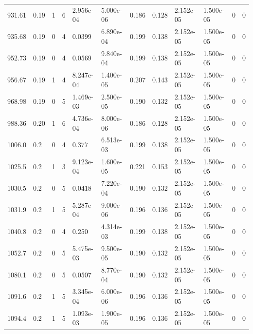 \documentclass[preview]{standalone}
\begin{document}
{{{\begin{tabular}{L{1.2cm}C{1.2cm} C{0.3cm}C{0.5cm} C{1.4cm}C{1.4cm} C{1.4cm}C{1.4cm} C{1.6cm}C{1.6cm} C{1.6cm}C{1.6cm}}
  931.61  &  0.19  & 1     &  6 &  2.956e-04  & 5.000e-06  &  0.186&   0.128& 2.152e-05 & 1.500e-05   &  0 & 0  \\ 
  935.68  &  0.19  & 0     &  4 &  0.0399  & 6.890e-04  &  0.199&   0.138& 2.152e-05 & 1.500e-05   &  0 & 0  \\ 
  952.73  &  0.19  & 0     &  4 &  0.0569  & 9.840e-04  &  0.199&   0.138& 2.152e-05 & 1.500e-05   &  0 & 0  \\ 
  956.67  &  0.19  & 1     &  4 &  8.247e-04  & 1.400e-05  &  0.207&   0.143& 2.152e-05 & 1.500e-05   &  0 & 0  \\ 
  968.98  &  0.19  & 0     &  5 &  1.469e-03  & 2.500e-05  &  0.190&   0.132& 2.152e-05 & 1.500e-05   &  0 & 0  \\ 
  988.36  &  0.20  & 1     &  6 &  4.736e-04  & 8.000e-06  &  0.186&   0.128& 2.152e-05 & 1.500e-05   &  0 & 0  \\ 
  1006.0  &   0.2  & 0     &  4 &  0.377  & 6.513e-03  &  0.199&   0.138& 2.152e-05 & 1.500e-05   &  0 & 0  \\ 
  1025.5  &   0.2  & 1     &  3 &  9.123e-04  & 1.600e-05  &  0.221&   0.153& 2.152e-05 & 1.500e-05   &  0 & 0  \\ 
  1030.5  &   0.2  & 0     &  5 &  0.0418  & 7.220e-04  &  0.190&   0.132& 2.152e-05 & 1.500e-05   &  0 & 0  \\ 
  1031.9  &   0.2  & 1     &  5 &  5.287e-04  & 9.000e-06  &  0.196&   0.136& 2.152e-05 & 1.500e-05   &  0 & 0  \\ 
  1040.8  &   0.2  & 0     &  4 &  0.250  & 4.314e-03  &  0.199&   0.138& 2.152e-05 & 1.500e-05   &  0 & 0  \\ 
  1052.7  &   0.2  & 0     &  5 &  5.475e-03  & 9.500e-05  &  0.190&   0.132& 2.152e-05 & 1.500e-05   &  0 & 0  \\ 
  1080.1  &   0.2  & 0     &  5 &  0.0507  & 8.770e-04  &  0.190&   0.132& 2.152e-05 & 1.500e-05   &  0 & 0  \\ 
  1091.6  &   0.2  & 1     &  5 &  3.345e-04  & 6.000e-06  &  0.196&   0.136& 2.152e-05 & 1.500e-05   &  0 & 0  \\ 
  1094.4  &   0.2  & 1     &  5 &  1.093e-03  & 1.900e-05  &  0.196&   0.136& 2.152e-05 & 1.500e-05   &  0 & 0  \\ 
\hline 
\end{tabular} 

}}}
\end{document}
